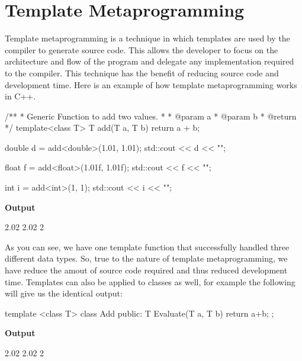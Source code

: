 \documentclass[12pt,a4paper]{article}
\begin{document}
\section{Template Metaprogramming}
Template metaprogramming is a technique in which templates are used by the compiler to generate source code. This allows the developer to focus on the architecture and flow of the program and delegate any implementation required to the compiler. This technique has the benefit of reducing source code and development time. Here is an example of how template metaprogramming works in C++.
\begin{cppsource}

/**
 * Generic Function to add two values.
 *
 * @param a
 * @param b
 * @return 
 */
template<class T>
T add(T a, T b) {
    return a + b;
}

    double d = add<double>(1.01, 1.01);
    std::cout << d << "\n";

    float f = add<float>(1.01f, 1.01f);
    std::cout << f << "\n";

    int i = add<int>(1, 1);
    std::cout << i << "\n";
    
\end{cppsource}

\textbf{Output}
\begin{myoutput}
2.02
2.02
2
\end{myoutput}
As you can see, we have one template function that successfully handled three different data types. So, true to the nature of template metaprogramming, we have reduce the amout of source code required and thus reduced development time. Templates can also be applied to classes as well, for example the following will give us the identical output:

\begin{cppsource}

template <class T>
class Add{
    public:
    T Evaluate(T a, T b){
        return a+b;
    }
};

\end{cppsource}
\textbf{Output}
\begin{myoutput}
2.02
2.02
2
\end{myoutput}
  
\end{document}

